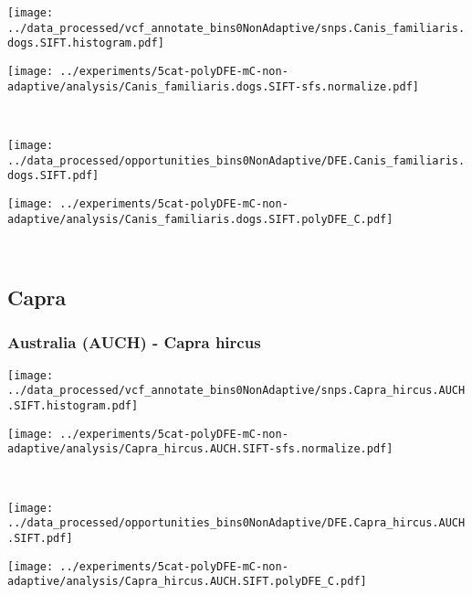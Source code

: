 \begin{minipage}{0.49\linewidth}
    \texttt{[image: ../data\_processed/vcf\_annotate\_bins0NonAdaptive/snps.Canis\_familiaris.dogs.SIFT.histogram.pdf]}
\end{minipage}
\begin{minipage}{0.49\linewidth}
    \texttt{[image: ../experiments/5cat-polyDFE-mC-non-adaptive/analysis/Canis\_familiaris.dogs.SIFT-sfs.normalize.pdf]}
\end{minipage}
\\
\begin{minipage}{0.49\linewidth}
    \texttt{[image: ../data\_processed/opportunities\_bins0NonAdaptive/DFE.Canis\_familiaris.dogs.SIFT.pdf]}
\end{minipage}
\begin{minipage}{0.49\linewidth}
    \texttt{[image: ../experiments/5cat-polyDFE-mC-non-adaptive/analysis/Canis\_familiaris.dogs.SIFT.polyDFE\_C.pdf]}
\end{minipage}
\\

\subsection{Capra}

\subsubsection{Australia (AUCH) - Capra hircus}

\begin{minipage}{0.49\linewidth}
    \texttt{[image: ../data\_processed/vcf\_annotate\_bins0NonAdaptive/snps.Capra\_hircus.AUCH.SIFT.histogram.pdf]}
\end{minipage}
\begin{minipage}{0.49\linewidth}
    \texttt{[image: ../experiments/5cat-polyDFE-mC-non-adaptive/analysis/Capra\_hircus.AUCH.SIFT-sfs.normalize.pdf]}
\end{minipage}
\\
\begin{minipage}{0.49\linewidth}
    \texttt{[image: ../data\_processed/opportunities\_bins0NonAdaptive/DFE.Capra\_hircus.AUCH.SIFT.pdf]}
\end{minipage}
\begin{minipage}{0.49\linewidth}
    \texttt{[image: ../experiments/5cat-polyDFE-mC-non-adaptive/analysis/Capra\_hircus.AUCH.SIFT.polyDFE\_C.pdf]}
\end{minipage}
\\

